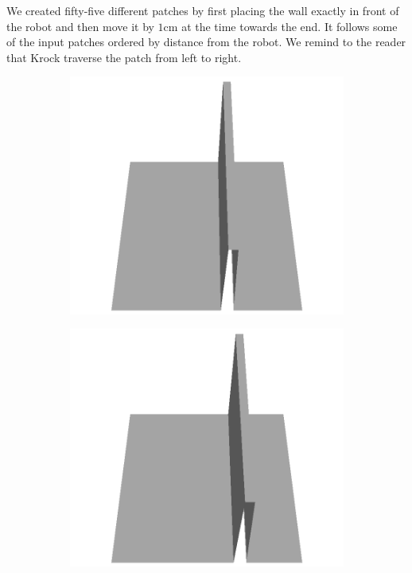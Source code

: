 \documentclass[../document.tex]{subfiles}
\begin{document}
We created fifty-five different patches by first placing the wall exactly in front of the robot and then move it by $1$cm at the time towards the end. It follows some of the input patches ordered by distance from the robot. We remind to the reader that Krock traverse the patch from left to right.
\begin{figure}[H]
    \centering
    \begin{subfigure}[b]{0.24\textwidth}
    \includegraphics[width=\linewidth]{../img/5/custom_patches/walls_front/all/55-3d.png}
    \end{subfigure}
    \begin{subfigure}[b]{0.24\textwidth}
    \includegraphics[width=\linewidth]{../img/5/custom_patches/walls_front/all/45-3d.png}

\end{subfigure}
\end{figure}
\end{document}

